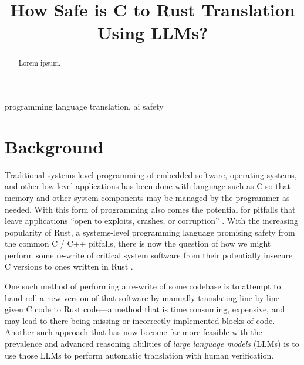 \documentclass[conference]{IEEEtran}
\begin{document}
\title{How Safe is C to Rust Translation Using LLMs?}

\author{
\and
{}
}

\maketitle

\begin{abstract}
Lorem ipsum.
\end{abstract}

\begin{IEEEkeywords}
programming language translation, ai safety
\end{IEEEkeywords}

\section{Background}
Traditional systems-level programming of embedded software, operating systems,
and other low-level applications has been done with language such as C so that
memory and other system components may be managed by the programmer as needed.
With this form of programming also comes the potential for pitfalls that leave
applications ``open to exploits, crashes, or corruption'' 
\cite{klabnik2018rust_book}. With the increasing popularity of Rust, a
systems-level programming language promising safety from the common C / C++
pitfalls, there is now the question of how we might perform some re-write of
critical system software from their potentially insecure C versions to ones
written in Rust \cite{klabnik2018rust_book, emre2021translating}.

One such method of performing a re-write of some codebase is to attempt to
hand-roll a new version of that software by manually translating line-by-line
given C code to Rust code---a method that is time consuming, expensive, and
may lead to there being missing or incorrectly-implemented blocks of code.
Another such approach that has now become far more feasible with the
prevalence and advanced reasoning abilities of \textit{large language models}
(LLMs) is to use those LLMs to perform automatic translation with human
verification.
\end{document}
